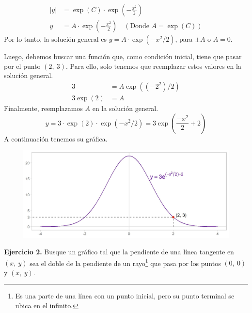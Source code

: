 \documentclass[12pt]{article}
\begin{document}
\newpage

\begin{align*}
  \lvert y \rvert &= \exp(C) \cdot \exp\left(- \frac{x^{2}}{2}\right) \\
  y &= A \cdot \exp\left(- \frac{x^{2}}{2}\right) \quad (\text{Donde } A = \exp(C))
\end{align*}
Por lo tanto, la solución general es $y = A \cdot \exp(- x^{2}/2)$, para $\pm A$ o $A = 0$.

Luego, debemos buscar una función que, como condición inicial, tiene que pasar por el punto $(2, \ 3)$. Para ello, solo tenemos que reemplazar estos valores en la solución general.
\begin{align*}
  3 &= A \exp((-2^{2})/2) \\
  3\exp(2) &= A
\end{align*}
Finalmente, reemplazamos $A$ en la solución general.
\[
  y = 3 \cdot \exp(2) \cdot \exp(-x^{2}/2)
    = 3\exp\left(\frac{-x^{2}}{2} + 2\right)
\]
A continuación tenemos su gráfica.

\begin{figure}[hbt!]
\centering
\includegraphics[scale=0.7]{img/diff_eq_exer.jpg}
\end{figure}

\textbf{Ejercicio 2.} \quad Busque un gráfico tal que la pendiente de una línea tangente en $(x, \ y)$ sea el doble de la pendiente de un rayo\footnote{Es una parte de una línea con un punto inicial, pero su punto terminal se ubica en el infinito.} que pasa por los puntos $(0, \ 0)$ y $(x, \ y)$.
\end{document}
